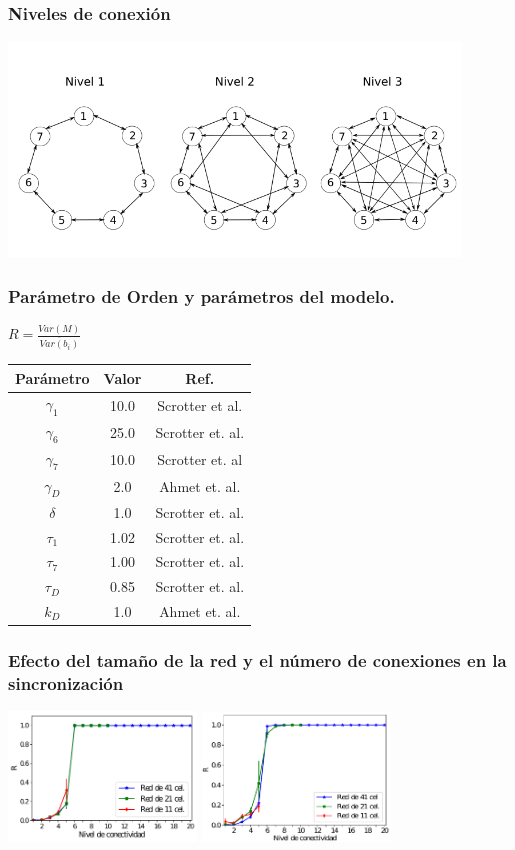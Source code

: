 \documentclass[xcolor=table, xllnames]{beamer}
\begin{document}
\begin{frame}
	\frametitle{Niveles de conexi\'on}
	\includegraphics[width = 12cm]{Figuras/niveles.png}
\end{frame}

\begin{frame}
	\frametitle{Parámetro de Orden y par\'ametros del modelo.}
	\centering $R=\frac{Var(M)}{\overline{Var(b_i)}}$
	\pause
	\begin{table}
		\begin{tabular}{|c | c| c|}
			\hline Par\'ametro &Valor & Ref. \\ \hline
			$\gamma_1$ & 10.0 & Scrotter et al. \\ \hline 
			$\gamma_6$ & 25.0 & Scrotter et. al.\\ \hline
			$\gamma_7$ & 10.0 & Scrotter et. al\\ \hline
			$\gamma_D$ & 2.0 & Ahmet et. al. \\ \hline
			$\delta$   & 1.0 & Scrotter et. al. \\ \hline
			$\tau_1 $ & 1.02 & Scrotter et. al.\\ \hline
			$\tau_7 $ & 1.00 & Scrotter et. al.\\ \hline
			$\tau_D $ & 0.85 &Scrotter et. al. \\ \hline
			$k_D $ & 1.0 & Ahmet et. al.\\ \hline
		\end{tabular}
	\end{table}
\end{frame}


\begin{frame}
	\frametitle{Efecto del tamaño de la red y el número de conexiones en la sincronización}
		\centering
		\includegraphics[width=5.0cm]{Figuras/figuraVCIVer533graf.pdf}
		\pause
		\includegraphics[width=5.0cm]{Figuras/figuraVCIVer1301281273graf.pdf}
\end{frame}
\end{document}
